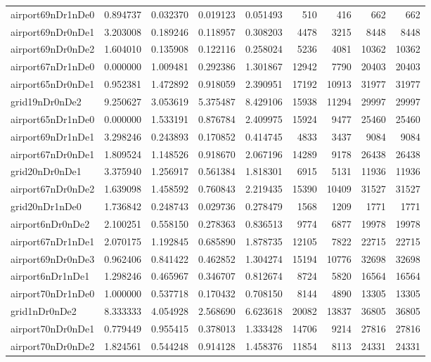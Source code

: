\begin{longtable}{|l|r|r|r|r|r|r|r|r|}
airport69nDr1nDe0 & 0.894737 & 0.032370 & 0.019123 & 0.051493 & 510 & 416 & 662 & 662 \\
airport69nDr0nDe1 & 3.203008 & 0.189246 & 0.118957 & 0.308203 & 4478 & 3215 & 8448 & 8448 \\
airport69nDr0nDe2 & 1.604010 & 0.135908 & 0.122116 & 0.258024 & 5236 & 4081 & 10362 & 10362 \\
airport67nDr1nDe0 & 0.000000 & 1.009481 & 0.292386 & 1.301867 & 12942 & 7790 & 20403 & 20403 \\
airport65nDr0nDe1 & 0.952381 & 1.472892 & 0.918059 & 2.390951 & 17192 & 10913 & 31977 & 31977 \\
grid19nDr0nDe2 & 9.250627 & 3.053619 & 5.375487 & 8.429106 & 15938 & 11294 & 29997 & 29997 \\
airport65nDr1nDe0 & 0.000000 & 1.533191 & 0.876784 & 2.409975 & 15924 & 9477 & 25460 & 25460 \\
airport69nDr1nDe1 & 3.298246 & 0.243893 & 0.170852 & 0.414745 & 4833 & 3437 & 9084 & 9084 \\
airport67nDr0nDe1 & 1.809524 & 1.148526 & 0.918670 & 2.067196 & 14289 & 9178 & 26438 & 26438 \\
grid20nDr0nDe1 & 3.375940 & 1.256917 & 0.561384 & 1.818301 & 6915 & 5131 & 11936 & 11936 \\
airport67nDr0nDe2 & 1.639098 & 1.458592 & 0.760843 & 2.219435 & 15390 & 10409 & 31527 & 31527 \\
grid20nDr1nDe0 & 1.736842 & 0.248743 & 0.029736 & 0.278479 & 1568 & 1209 & 1771 & 1771 \\
airport6nDr0nDe2 & 2.100251 & 0.558150 & 0.278363 & 0.836513 & 9774 & 6877 & 19978 & 19978 \\
airport67nDr1nDe1 & 2.070175 & 1.192845 & 0.685890 & 1.878735 & 12105 & 7822 & 22715 & 22715 \\
airport69nDr0nDe3 & 0.962406 & 0.841422 & 0.462852 & 1.304274 & 15194 & 10776 & 32698 & 32698 \\
airport6nDr1nDe1 & 1.298246 & 0.465967 & 0.346707 & 0.812674 & 8724 & 5820 & 16564 & 16564 \\
airport70nDr1nDe0 & 1.000000 & 0.537718 & 0.170432 & 0.708150 & 8144 & 4890 & 13305 & 13305 \\
grid1nDr0nDe2 & 8.333333 & 4.054928 & 2.568690 & 6.623618 & 20082 & 13837 & 36805 & 36805 \\
airport70nDr0nDe1 & 0.779449 & 0.955415 & 0.378013 & 1.333428 & 14706 & 9214 & 27816 & 27816 \\
airport70nDr0nDe2 & 1.824561 & 0.544248 & 0.914128 & 1.458376 & 11854 & 8113 & 24331 & 24331 \\

\end{longtable}
